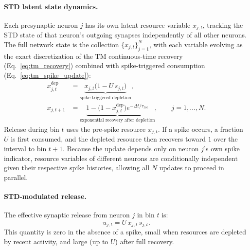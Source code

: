 \documentclass[11pt]{article}
\begin{document}
\paragraph{STD latent state dynamics.}
Each presynaptic neuron $j$ has its own latent resource variable $x_{j,t}$,
tracking the STD state of that neuron's outgoing synapses independently of all
other neurons. The full network state is the collection $\{x_{j,t}\}_{j=1}^{N}$,
with each variable evolving as the exact discretization of the TM continuous-time
recovery (Eq.~\ref{eq:tm_recovery}) combined with spike-triggered consumption
(Eq.~\ref{eq:tm_spike_update}):
\begin{equation}
\begin{aligned}
x^{\mathrm{dep}}_{j,t}
&=
\underbrace{x_{j,t}\big(1-U\,s_{j,t}\big)}_{\text{spike-triggered depletion}},
\\
x_{j,t+1}
&=
\underbrace{1-\big(1-x^{\mathrm{dep}}_{j,t}\big)
e^{-\Delta t/\tau_{\mathrm{rec}}}}_{\text{exponential recovery after depletion}},
\qquad j=1,\dots,N .
\end{aligned}
\label{eq:std_ssm_state}
\end{equation}
Release during bin $t$ uses the pre-spike resource $x_{j,t}$. If a spike occurs,
a fraction $U$ is first consumed, and the depleted resource then recovers toward
$1$ over the interval to bin $t+1$. Because the update depends only on neuron
$j$'s own spike indicator, resource variables of different neurons are
conditionally independent given their respective spike histories, allowing all
$N$ updates to proceed in parallel.

\paragraph{STD-modulated release.}
The effective synaptic release from neuron $j$ in bin $t$ is:
\begin{equation}
u_{j,t}=U\,x_{j,t}\,s_{j,t}.
\label{eq:std_release}
\end{equation}
This quantity is zero in the absence of a spike, small when resources are depleted
by recent activity, and large (up to $U$) after full recovery.
\end{document}

